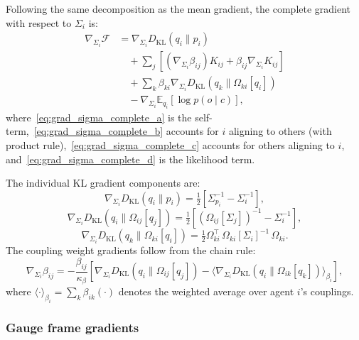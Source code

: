 \documentclass[twoside,11pt]{article}
\begin{document}
Following the same decomposition as the mean gradient, the complete gradient with respect to $\Sigma_i$ is:
\begin{align}
\nabla_{\Sigma_i} \mathcal{F} &= 
\nabla_{\Sigma_i} D_{\mathrm{KL}}(q_i \| p_i) \label{eq:grad_sigma_complete_a} \\
&\quad + \sum_j \left[(\nabla_{\Sigma_i} \beta_{ij}) K_{ij} + \beta_{ij} \nabla_{\Sigma_i} K_{ij}\right] \label{eq:grad_sigma_complete_b} \\
&\quad + \sum_k \beta_{ki} \nabla_{\Sigma_i} D_{\mathrm{KL}}(q_k \| \Omega_{ki}[q_i]) \label{eq:grad_sigma_complete_c} \\
&\quad - \nabla_{\Sigma_i} \mathbb{E}_{q_i}[\log p(o \mid c)], \label{eq:grad_sigma_complete_d}
\end{align}
where~\eqref{eq:grad_sigma_complete_a} is the self-term,~\eqref{eq:grad_sigma_complete_b} accounts for $i$ aligning to others (with product rule),~\eqref{eq:grad_sigma_complete_c} accounts for others aligning to $i$, and~\eqref{eq:grad_sigma_complete_d} is the likelihood term.

The individual KL gradient components are:
\begin{equation}
\nabla_{\Sigma_i} D_{\mathrm{KL}}(q_i \| p_i) =
\tfrac{1}{2}\left[\Sigma_{p_i}^{-1} - \Sigma_i^{-1}\right],
\label{eq:grad_sigma_self_component}
\end{equation}
\begin{equation}
\nabla_{\Sigma_i} D_{\mathrm{KL}}(q_i \| \Omega_{ij}[q_j]) = 
\tfrac{1}{2}\left[(\Omega_{ij}[\Sigma_j])^{-1} - \Sigma_i^{-1}\right],
\label{eq:grad_sigma_kl_forward}
\end{equation}
\begin{equation}
\nabla_{\Sigma_i} D_{\mathrm{KL}}(q_k \| \Omega_{ki}[q_i]) =
\tfrac{1}{2} \Omega_{ki}^\top \, \Omega_{ki}[\Sigma_i]^{-1} \, \Omega_{ki}.
\label{eq:grad_sigma_kl_backward}
\end{equation}
The coupling weight gradients follow from the chain rule:
\begin{equation}
\nabla_{\Sigma_i} \beta_{ij} = -\frac{\beta_{ij}}{\kappa_\beta} \left[\nabla_{\Sigma_i} D_{\mathrm{KL}}(q_i \| \Omega_{ij}[q_j]) - \langle \nabla_{\Sigma_i} D_{\mathrm{KL}}(q_i \| \Omega_{ik}[q_k]) \rangle_{\beta_i} \right],
\label{eq:grad_sigma_beta}
\end{equation}
where $\langle \cdot \rangle_{\beta_i} = \sum_k \beta_{ik}(\cdot)$ denotes the weighted average over agent $i$'s couplings.

\subsubsection{Gauge frame gradients}
\end{document}

